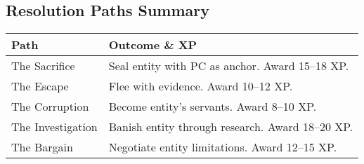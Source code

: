 \documentclass[11pt]{article}
\begin{document}
\subsection*{Resolution Paths Summary}

\begin{tabular}{|p{4cm}|p{8cm}|}
\hline
\rowcolor{tableheader}
\textbf{Path} & \textbf{Outcome \& XP} \\
\hline
The Sacrifice & Seal entity with PC as anchor. Award 15–18 XP. \\
The Escape & Flee with evidence. Award 10–12 XP. \\
The Corruption & Become entity's servants. Award 8–10 XP. \\
The Investigation & Banish entity through research. Award 18–20 XP. \\
The Bargain & Negotiate entity limitations. Award 12–15 XP. \\
\hline
\end{tabular}
\end{document}
